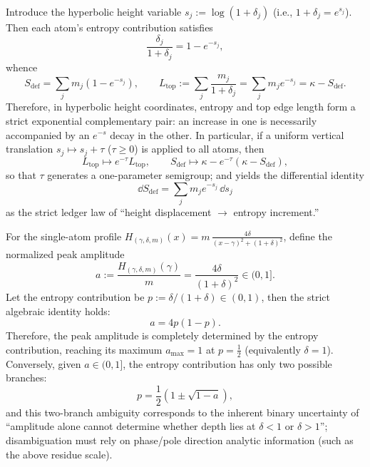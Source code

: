 \begin{proposition}
Introduce the hyperbolic height variable \(s_j:=\log(1+\delta_j)\) (i.e., \(1+\delta_j=e^{s_j}\)).
Then each atom's entropy contribution satisfies
\[
\frac{\delta_j}{1+\delta_j}=1-e^{-s_j},
\]
whence
\[
S_{\mathrm{def}}=\sum_{j}m_j(1-e^{-s_j}),
\qquad
L_{\mathrm{top}}:=\sum_{j}\frac{m_j}{1+\delta_j}=\sum_{j}m_j e^{-s_j}
=\kappa-S_{\mathrm{def}}.
\]
Therefore, in hyperbolic height coordinates, entropy and top edge length form a strict exponential complementary pair: an increase in one is necessarily accompanied by an \(e^{-s}\) decay in the other.
In particular, if a uniform vertical translation \(s_j\mapsto s_j+\tau\) (\(\tau\ge0\)) is applied to all atoms, then
\[
L_{\mathrm{top}}\longmapsto e^{-\tau}L_{\mathrm{top}},
\qquad
S_{\mathrm{def}}\longmapsto \kappa-e^{-\tau}(\kappa-S_{\mathrm{def}}),
\]
so that \(\tau\) generates a one-parameter semigroup; and yields the differential identity
\[
\boxed{\;
\dd S_{\mathrm{def}}=\sum_{j}m_j e^{-s_j}\,\dd s_j\;}
\]
as the strict ledger law of ``height displacement \(\to\) entropy increment.''
\end{proposition}

\begin{proposition}
For the single-atom profile
\(
H_{(\gamma,\delta,m)}(x)=m\,\frac{4\delta}{(x-\gamma)^2+(1+\delta)^2}
 \),
define the normalized peak amplitude
\[
a:=\frac{H_{(\gamma,\delta,m)}(\gamma)}{m}
=\frac{4\delta}{(1+\delta)^2}\in(0,1].
\]
Let the entropy contribution be \(p:=\delta/(1+\delta)\in(0,1)\), then the strict algebraic identity holds:
\[
\boxed{\;a=4p(1-p).\;}
\]
Therefore, the peak amplitude is completely determined by the entropy contribution, reaching its maximum \(a_{\max}=1\) at \(p=\tfrac12\) (equivalently \(\delta=1\)).
Conversely, given \(a\in(0,1]\), the entropy contribution has only two possible branches:
\[
p=\frac12\left(1\pm\sqrt{1-a}\right),
\]
and this two-branch ambiguity corresponds to the inherent binary uncertainty of ``amplitude alone cannot determine whether depth lies at \(\delta<1\) or \(\delta>1\)''; disambiguation must rely on phase/pole direction analytic information (such as the above residue scale).
\end{proposition}

